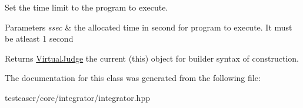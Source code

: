 Set the time limit to the program to execute. 


\begin{DoxyParams}{Parameters}
{\em ssec} & the allocated time in second for program to execute. It must be atleast 1 second \\
\hline
\end{DoxyParams}
\begin{DoxyReturn}{Returns}
\hyperlink{classtestcaser_1_1integrator_1_1VirtualJudge}{Virtual\+Judge} the current (this) object for builder syntax of construction. 
\end{DoxyReturn}


The documentation for this class was generated from the following file\+:\begin{DoxyCompactItemize}
\item 
testcaser/core/integrator/integrator.\+hpp\end{DoxyCompactItemize}
